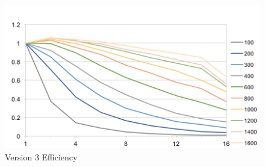 \documentclass{report}
\begin{document}
\begin{figure}[h]
\includegraphics[width=1\textwidth]{V3-Efficiency}
\caption{Version 3 Efficiency}
\label{fig:subim6}
\end{figure}
\end{document}
